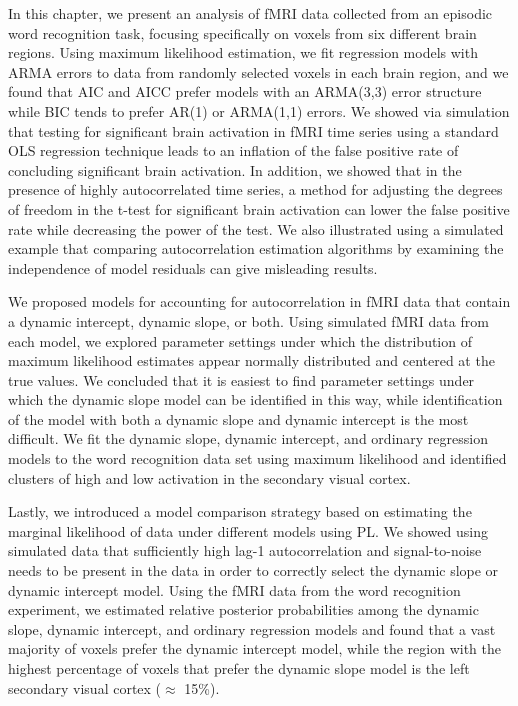In this chapter, we present an analysis of fMRI data collected from an episodic word recognition task, focusing specifically on voxels from six different brain regions. Using maximum likelihood estimation, we fit regression models with ARMA errors to data from randomly selected voxels in each brain region, and we found that AIC and AICC prefer models with an ARMA(3,3) error structure while BIC tends to prefer AR(1) or ARMA(1,1) errors. We showed via simulation that testing for significant brain activation in fMRI time series using a standard OLS regression technique leads to an inflation of the false positive rate of concluding significant brain activation. In addition, we showed that in the presence of highly autocorrelated time series, a method for adjusting the degrees of freedom in the t-test for significant brain activation can lower the false positive rate while decreasing the power of the test. We also illustrated using a simulated example that comparing autocorrelation estimation algorithms by examining the independence of model residuals can give misleading results.

We proposed models for accounting for autocorrelation in fMRI data that contain a dynamic intercept, dynamic slope, or both. Using simulated fMRI data from each model, we explored parameter settings under which the distribution of maximum likelihood estimates appear normally distributed and centered at the true values. We concluded that it is easiest to find parameter settings under which the dynamic slope model can be identified in this way, while identification of the model with both a dynamic slope and dynamic intercept is the most difficult. We fit the dynamic slope, dynamic intercept, and ordinary regression models to the word recognition data set using maximum likelihood and identified clusters of high and low activation in the secondary visual cortex.

Lastly, we introduced a model comparison strategy based on estimating the marginal likelihood of data under different models using PL. We showed using simulated data that sufficiently high lag-1 autocorrelation and signal-to-noise needs to be present in the data in order to correctly select the dynamic slope or dynamic intercept model. Using the fMRI data from the word recognition experiment, we estimated relative posterior probabilities among the dynamic slope, dynamic intercept, and ordinary regression models and found that a vast majority of voxels prefer the dynamic intercept model, while the region with the highest percentage of voxels that prefer the dynamic slope model is the left secondary visual cortex ($\approx$ 15\%).

